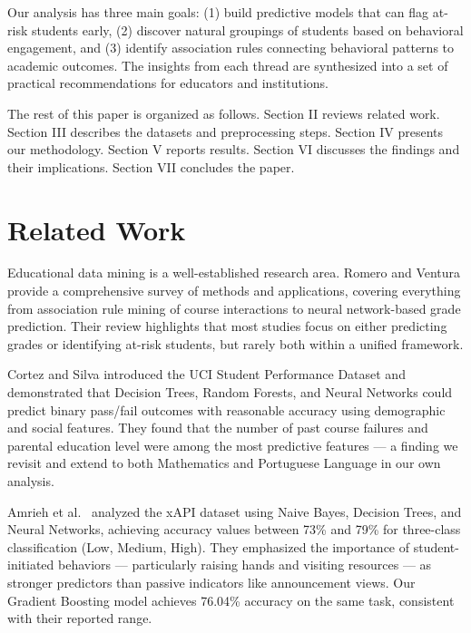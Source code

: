 \documentclass[conference]{IEEEtran}
\begin{document}
Our analysis has three main goals: (1) build predictive models that can flag at-risk students early, (2) discover natural groupings of students based on behavioral engagement, and (3) identify association rules connecting behavioral patterns to academic outcomes. The insights from each thread are synthesized into a set of practical recommendations for educators and institutions.

The rest of this paper is organized as follows. Section II reviews related work. Section III describes the datasets and preprocessing steps. Section IV presents our methodology. Section V reports results. Section VI discusses the findings and their implications. Section VII concludes the paper.

\section{Related Work}

Educational data mining is a well-established research area. Romero and Ventura \cite{romero2010educational} provide a comprehensive survey of methods and applications, covering everything from association rule mining of course interactions to neural network-based grade prediction. Their review highlights that most studies focus on either predicting grades or identifying at-risk students, but rarely both within a unified framework.

Cortez and Silva \cite{cortez2008using} introduced the UCI Student Performance Dataset and demonstrated that Decision Trees, Random Forests, and Neural Networks could predict binary pass/fail outcomes with reasonable accuracy using demographic and social features. They found that the number of past course failures and parental education level were among the most predictive features — a finding we revisit and extend to both Mathematics and Portuguese Language in our own analysis.

Amrieh et al.~\cite{amrieh2016mining} analyzed the xAPI dataset using Naive Bayes, Decision Trees, and Neural Networks, achieving accuracy values between 73\% and 79\% for three-class classification (Low, Medium, High). They emphasized the importance of student-initiated behaviors — particularly raising hands and visiting resources — as stronger predictors than passive indicators like announcement views. Our Gradient Boosting model achieves 76.04\% accuracy on the same task, consistent with their reported range.
\end{document}
